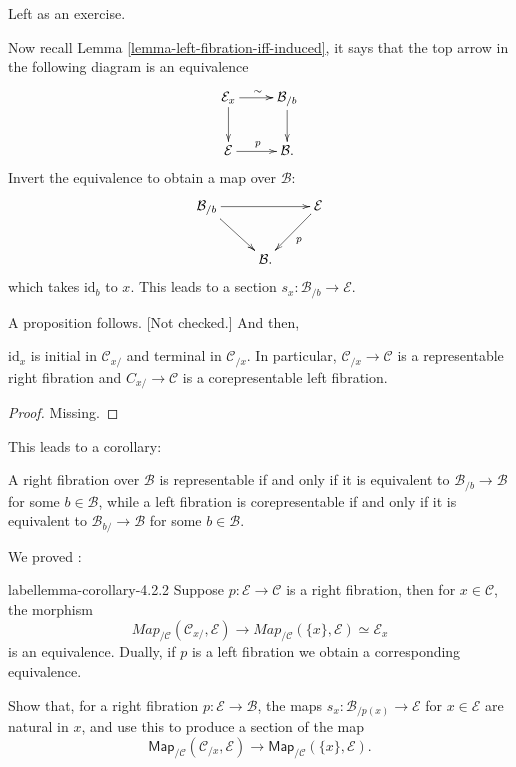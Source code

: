 Left as an exercise.


\medskip\noindent
Now recall Lemma
\ref{lemma-left-fibration-iff-induced},
it says that the top arrow in the following
diagram
is an equivalence
$$
\xymatrix{
\mathcal{E}_x\ar[r]^\sim\ar[d]&\mathcal{B}_{/
b}\ar[d]\\
\mathcal{E}\ar[r]^p&\mathcal{B}.
}
$$
Invert the equivalence to obtain a map over
$\mathcal{B}$:
$$
\xymatrix{
\mathcal{B}_{/b} \ar[rd] \ar[rr] &&
\mathcal{E} \ar[dl]^{p} \\
& \mathcal{B}.
}
$$
which takes $\text{id}_b$ to $x$.
This leads to a section
$s_x:\mathcal{B}_{/b}\to \mathcal{E}$.

\medskip\noindent
A proposition follows. [Not checked.] And
then,

\begin{proposition}
\label{proposition-maps-over-x-repre}
$\text{id}_x$ is initial in
$\mathcal{C}_{x/}$
and terminal in $\mathcal{C}_{/x}$.
In particular, $\mathcal{C}_{/x}\to
\mathcal{C}$
is a representable right fibration
and $C_{x/}\to \mathcal{C}$ is a
corepresentable left fibration.
\end{proposition}

\begin{proof}
Missing.
\end{proof}

\noindent
This leads to a corollary:

\begin{corollary}
\label{lemma-fibra-equiv-iff-maps-over}
A right fibration over $\mathcal{B}$ is
representable
if and only if it is equivalent to
$\mathcal{B}_{/b}\to \mathcal{B}$
for some $b \in \mathcal{B}$,
while a left fibration is corepresentable if
and only if
it is equivalent to $\mathcal{B}_{b/}\to
\mathcal{B}$
for some $b \in \mathcal{B}$.
\end{corollary}

\medskip\noindent
We proved \cite[Corollary 4.2.2]{rune}:
\begin{lemma}
label{lemma-corollary-4.2.2}
Suppose $p:\mathcal{E}\to\mathcal{C}$ is a
right fibration,
then for $x \in \mathcal{C}$, the morphism
$$
Map_{/\mathcal{C}}(\mathcal{C}_{x/},
\mathcal{E})\to
Map_{/\mathcal{C}}(\{x\},\mathcal{E}) \simeq
\mathcal{E}_x
$$
is an equivalence.
Dually, if $p$ is a left fibration we obtain
a corresponding
equivalence.
\end{lemma}

\begin{exercise}
\label{exercise-4.1}
Show that, for a right fibration
$p:\mathcal{E} \to \mathcal{B}$,
the maps $s_x:\mathcal{B}_{/p(x)} \to
\mathcal{E}$
for $x \in \mathcal{E}$ are natural in $x$,
and use this to produce a section of the map
 $$
\mathsf{Map}_{/\mathcal{C}}(\mathcal{C}_{/x},
\mathcal{E})
\to
\mathsf{Map}_{/\mathcal{C}}(\{x\},\mathcal{E}
).
$$

\end{exercise}

